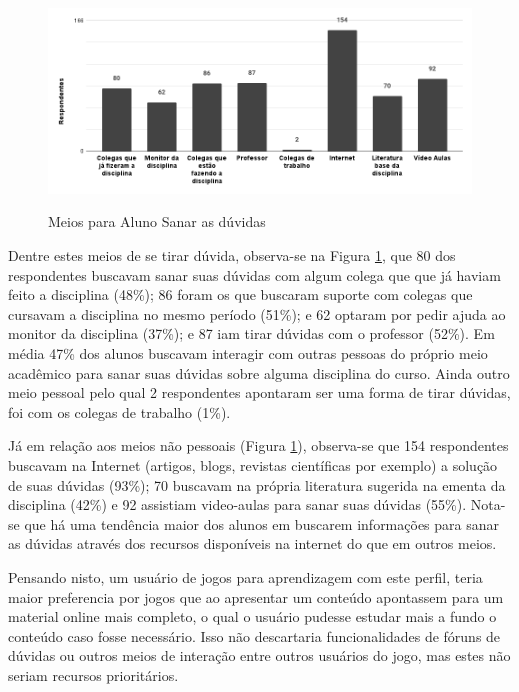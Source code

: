 \begin{figure}[htbp]
	\centering
	\caption{Meios para Aluno Sanar as dúvidas}
	\includegraphics[keepaspectratio=true,scale=0.485]{figuras/resultados/rel-rel.png}
	\label{Fig:rel-rel.png}
\end{figure}

Dentre estes meios de se tirar dúvida, observa-se na Figura \ref{Fig:rel-rel.png}, que 80 dos respondentes buscavam sanar suas dúvidas com algum colega que que já haviam feito a disciplina (48\%); 86 foram os que buscaram suporte com colegas que cursavam a disciplina no mesmo período (51\%); e 62 optaram por pedir ajuda ao monitor da disciplina (37\%); e 87 iam tirar dúvidas com o professor (52\%). Em média 47\% dos alunos buscavam interagir com outras pessoas do próprio meio acadêmico para sanar suas dúvidas sobre alguma disciplina do curso. Ainda outro meio pessoal pelo qual 2 respondentes apontaram ser uma forma de tirar dúvidas, foi com os colegas de trabalho (1\%).

Já em relação aos meios não pessoais (Figura \ref{Fig:rel-rel.png}), observa-se que 154 respondentes buscavam na Internet (artigos, blogs, revistas científicas por exemplo) a solução de suas dúvidas (93\%); 70 buscavam na própria literatura sugerida na ementa da disciplina (42\%) e 92 assistiam video-aulas para sanar suas dúvidas (55\%). Nota-se que há uma tendência maior dos alunos em buscarem informações para sanar as dúvidas através dos recursos disponíveis na internet do que em outros meios. 

Pensando nisto, um usuário de jogos para aprendizagem com este perfil, teria maior preferencia por jogos que ao apresentar um conteúdo apontassem para um material online mais completo, o qual o usuário pudesse estudar mais a fundo o conteúdo caso fosse necessário. Isso não descartaria funcionalidades de fóruns de dúvidas ou outros meios de interação entre outros usuários do jogo, mas estes não seriam recursos prioritários.


